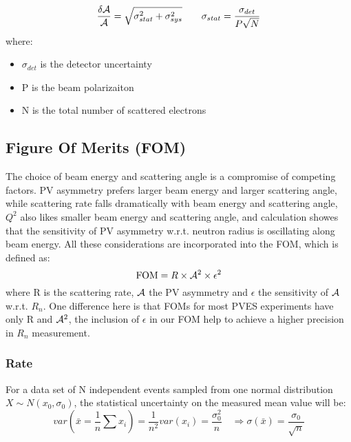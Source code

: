 \begin{equation}
    \frac{\delta \mathcal{A}}{\mathcal{A}} = \sqrt{\sigma^2_{stat} + \sigma^2_{sys}}	\qquad 
    \sigma_{stat} = \frac{\sigma_{det}}{P\sqrt{N}}
\end{equation}
where:
\begin{itemize}
    \item $\sigma_{det}$ is the detector uncertainty
    \item P is the beam polarizaiton
    \item N is the total number of scattered electrons
\end{itemize}

\subsection{Figure Of Merits (FOM)}
The choice of beam energy and scattering angle is a compromise of competing
factors. PV asymmetry prefers larger beam energy and larger scattering angle,
while scattering rate falls dramatically with beam energy and scattering angle,
$Q^2$ also likes smaller beam energy and scattering angle, and calculation 
showes that the sensitivity of PV asymmetry w.r.t. neutron radius is oscillating
along beam energy. All these considerations are incorporated into the FOM, which
is defined as:
\begin{equation*}
    \text{FOM} = R \times \mathcal{A}^2 \times \epsilon^2
\end{equation*}
where R is the scattering rate, $\mathcal{A}$ the PV asymmetry and $\epsilon$ 
the sensitivity of $\mathcal{A}$ w.r.t. $R_n$. One difference here is that FOMs for most PVES 
experiments have only R and $\mathcal{A}^2$, the inclusion of $\epsilon$ in our FOM help
to achieve a higher precision in $R_n$ measurement.

\subsubsection{Rate}
For a data set of N independent events sampled from one normal distribution 
$X\sim N(x_0, \sigma_0)$, the statistical uncertainty on the measured mean value
will be:
$$ var(\bar{x} = \frac{1}{n}\sum x_i) = \frac{1}{n^2}var(x_i) = \frac{\sigma_0^2}{n} 
\quad \Longrightarrow \sigma(\bar{x}) = \frac{\sigma_0}{\sqrt{n}} $$

